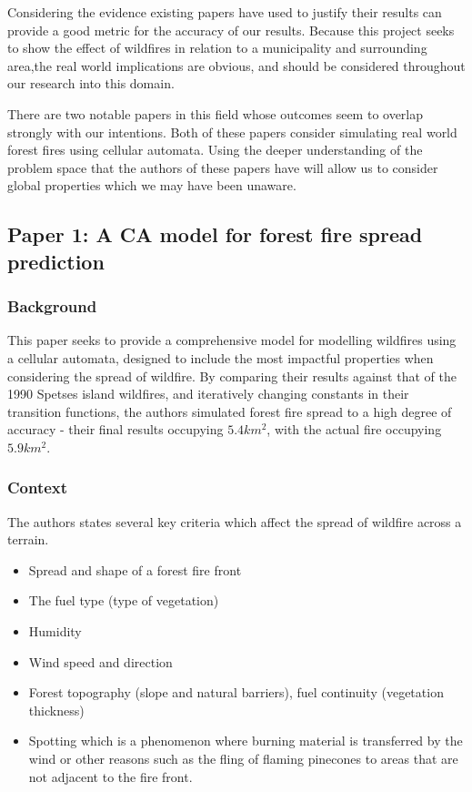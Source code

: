 \documentclass[11pt, a4paper, titlepage]{article}
\begin{document}
Considering the evidence existing papers have used to justify their results can provide a good metric for the accuracy of our results. Because this project seeks to show the effect of wildfires in relation to a municipality and surrounding area,the real world implications are obvious, and should be considered throughout our research into this domain.


There are two notable papers in this field whose outcomes seem to overlap strongly with our intentions. Both of these papers consider simulating real world forest fires using cellular automata. Using the deeper understanding of the problem space that the authors of these papers have will allow us to consider global properties which we may have been unaware.

  \subsection[Paper 1: A CA model for forest fire spread prediction]{ Paper 1: A CA model for forest fire spread prediction \cite{ALEXANDRIDIS2008191}}
  
    \subsubsection{Background}
 
    This paper seeks to provide a comprehensive model for modelling wildfires using a cellular automata, designed to include the most impactful properties when considering the spread of wildfire. By comparing their results against that of the 1990 Spetses island wildfires, and iteratively changing constants in their transition functions, the authors simulated forest fire spread to a high degree of accuracy - their final results occupying $5.4km^2$, with the actual fire occupying $5.9km^2$.
  
    \subsubsection{Context}  
    The authors states several key criteria which affect the spread of wildfire across a terrain.
    \begin{itemize}

      \item Spread and shape of a forest fire front
      \item The fuel type (type of vegetation)
      \item Humidity
      \item Wind speed and direction
      \item Forest topography (slope and natural barriers), fuel continuity (vegetation thickness)
      \item Spotting which is a phenomenon where burning material is transferred by the wind or other reasons such as the fling of flaming pinecones to areas that are not adjacent to the fire front.
    \end{itemize}
    
\end{document}
